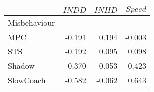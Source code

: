 \begin{tabular}{lrrr}
\toprule
{} &  $INDD$ &  $INHD$ &  $Speed$ \\
\midrule
Misbehaviour &         &         &          \\
MPC          &  -0.191 &   0.194 &   -0.003 \\
STS          &  -0.192 &   0.095 &    0.098 \\
Shadow       &  -0.370 &  -0.053 &    0.423 \\
SlowCoach    &  -0.582 &  -0.062 &    0.643 \\
\bottomrule
\end{tabular}
